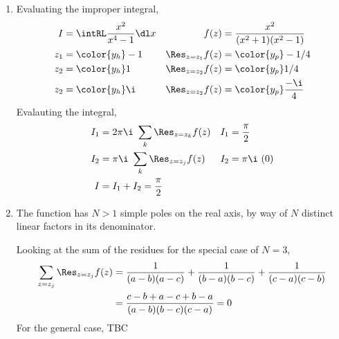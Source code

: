 \begin{enumerate}
    \item Evaluating the improper integral,
          \begin{align}
              I                   & = \intRL \frac{x^2}{x^4 - 1} \dl x &
              f(z)                & = \frac{x^2}{(x^2 + 1)(x^2 - 1)}     \\
              z_1                 & = \color{y_h} -1                   &
              \Res_{z = z_1} f(z) & = \color{y_p} -1/4                   \\
              z_2                 & = \color{y_h} 1                    &
              \Res_{z = z_2} f(z) & = \color{y_p} 1/4                    \\
              z_2                 & = \color{y_h} \i                   &
              \Res_{z = z_2} f(z) & = \color{y_p} \frac{-\i}{4}
          \end{align}
          Evalauting the integral,
          \begin{align}
              I_1 & = 2\pi\i\ \sum_{k} \Res_{z = z_k} f(z) &
              I_1 & = \frac{\pi}{2}                          \\
              I_2 & = \pi\i\ \sum_{k} \Res_{z = z_j} f(z)  &
              I_2 & = \pi\i\ (0)                             \\
              I   & = I_1 + I_2 = \frac{\pi}{2}
          \end{align}

    \item The function has $ N > 1 $ simple poles on the real axis, by way of
          $ N $ distinct linear factors in its denominator. \par
          Looking at the sum of the residues for the special case of $ N = 3 $,
          \begin{align}
              \sum_{z = z_j} \Res_{z = z_j}f(z) & = \frac{1}{(a-b)(a-c)}
              + \frac{1}{(b-a)(b-c)} + \frac{1}{(c-a)(c-b)}                \\
                                                & = \frac{c-b + a-c + b-a}
              {(a-b)(b-c)(c-a)} = 0
          \end{align}
          For the general case, TBC


\end{enumerate}
